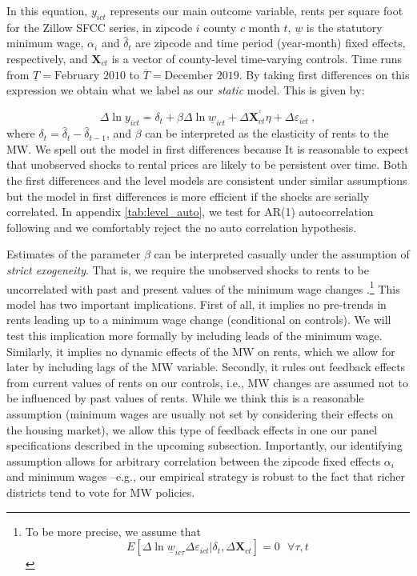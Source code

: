 In this equation, $y_{ict}$ represents our main outcome variable, rents per square foot 
for the Zillow SFCC series, in zipcode $i$ county $c$ month $t$, $\underline{w}$ is the 
statutory minimum wage, $\alpha_i$ and $\hat{\delta}_t$ are zipcode and time period (year-month) 
fixed effects, respectively, and $\mathbf{X}_{ct}$ is a vector of county-level time-varying 
controls. Time runs from $\underline{T} = \text{February 2010}$ to $\overline{T} = 
\text{December 2019}$. By taking first differences on this expression we obtain what 
we label as our \textit{static} model. This is given by:
    
\begin{equation}\label{eq:did}
	\Delta \ln y_{ict} = \delta_t
						+ \beta \Delta \ln \underline{w}_{ict}
						+ \Delta \mathbf{X}^{'}_{ct} \eta
						+ \Delta \varepsilon_{ict} \ ,
\end{equation}
where $\delta_t = \hat{\delta}_t - \hat{\delta}_{t-1}$, and $\beta$ can be interpreted 
as the elasticity of rents to the MW. We spell out the model in first differences because 
It is reasonable to expect that unobserved shocks to rental prices are likely to be persistent over 
time. Both the first differences and the level models are consistent under similar assumptions 
but the model in first differences is more efficient if the shocks are serially correlated. In appendix 
\autoref{tab:level_auto}, we test for AR(1) autocorrelation following \textcite[][chapter 10]
{wooldridge2010} and we comfortably reject the no auto correlation hypothesis. 

Estimates of the parameter $\beta$ can be interpreted casually under the assumption of
\textit{strict exogeneity}. That is, we require the unobserved shocks to rents to be uncorrelated
with past and present values of the minimum wage changes \parencite[][chapter 10]
{wooldridge2010}.\footnote{To be more precise, we assume that 
	$$E[\Delta \ln \underline{w}_{ic\tau} \Delta \varepsilon_{ict} | \delta_t, \Delta \mathbf{X}_{ct}] = 0
	\ \ \ \forall \tau, t$$}
This model has two important implications. First of all, it implies no pre-trends in 
rents leading up to a minimum wage change (conditional on controls). We will test this 
implication more formally by including leads of the minimum wage. Similarly, it implies no dynamic 
effects of the MW on rents, which we allow for later by including lags of the 
MW variable. Secondly, it rules out feedback effects from current values of rents 
on our controls, i.e., MW changes are assumed not to be influenced by past values of rents. 
While we think this is a reasonable assumption (minimum wages are usually not set by considering 
their effects on the housing market), we allow this type of feedback effects in one our panel 
specifications described in the upcoming subsection. Importantly, our identifying assumption 
allows for arbitrary correlation between the zipcode fixed effects $\alpha_i$ and minimum wages 
--e.g., our empirical strategy is robust to the fact that richer districts tend to vote for 
MW policies.

